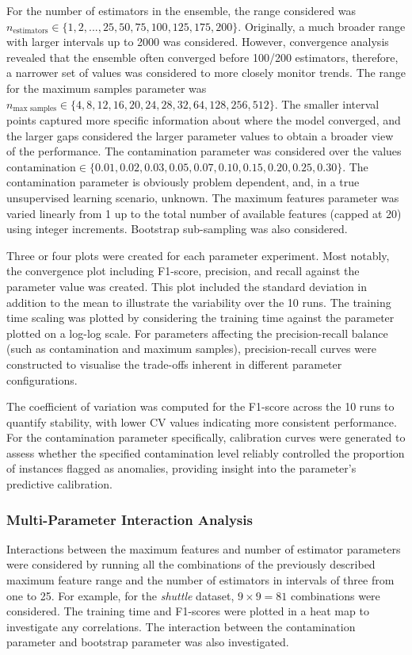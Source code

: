 \documentclass[10pt, conference]{IEEEtran}
\begin{document}
For the number of estimators in the ensemble, the range considered was $n_\text{estimators} \in \{1,2,...,25,50,75,100,125,175,200\}$. Originally, a much broader range with larger intervals up to 2000 was considered. However, convergence analysis revealed that the ensemble often converged before 100/200 estimators, therefore, a narrower set of values was considered to more closely monitor trends. The range for the maximum samples parameter was $n_\text{max samples} \in \{4,8,12,16,20,24,28,32,64,128,256, 512\}$. The smaller interval points captured more specific information about where the model converged, and the larger gaps considered the larger parameter values to obtain a broader view of the performance. The contamination parameter was considered over the values $\text{contamination} \in \{0.01, 0.02, 0.03, 0.05, 0.07, 0.10, 0.15, 0.20, 0.25, 0.30\}$. The contamination parameter is obviously problem dependent, and, in a true unsupervised learning scenario, unknown. The maximum features parameter was varied linearly from 1 up to the total number of available features (capped at 20) using integer increments. Bootstrap sub-sampling was also considered.

Three or four plots were created for each parameter experiment. Most notably, the convergence plot including F1-score, precision, and recall against the parameter value was created. This plot included the standard deviation in addition to the mean to illustrate the variability over the 10 runs. The training time scaling was plotted by considering the training time against the parameter plotted on a log-log scale. For parameters affecting the precision-recall balance (such as contamination and maximum samples), precision-recall curves were constructed to visualise the trade-offs inherent in different parameter configurations.

The coefficient of variation was computed for the F1-score across the 10 runs to quantify stability, with lower CV values indicating more consistent performance. For the contamination parameter specifically, calibration curves were generated to assess whether the specified contamination level reliably controlled the proportion of instances flagged as anomalies, providing insight into the parameter's predictive calibration.

\subsubsection{Multi-Parameter Interaction Analysis}
Interactions between the maximum features and number of estimator parameters were considered by running all the combinations of the previously described maximum feature range and the number of estimators in intervals of three from one to 25. For example, for the \textit{shuttle} dataset, $9 \times 9 = 81$ combinations were considered. The training time and F1-scores were plotted in a heat map to investigate any correlations. The interaction between the contamination parameter and bootstrap parameter was also investigated.
\end{document}
